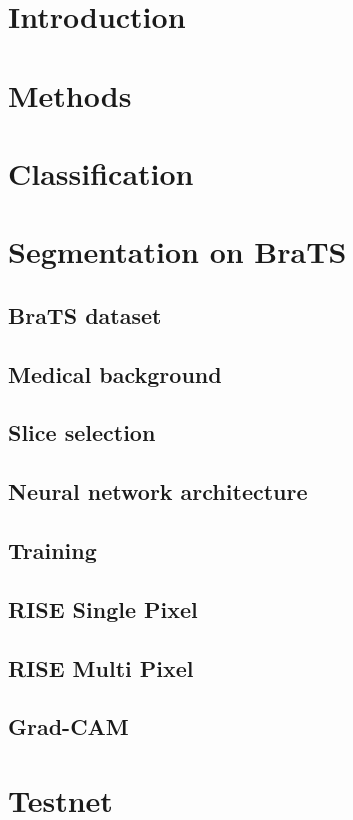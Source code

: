 \chapter{Introduction}


\chapter{Methods}


\chapter{Classification}



\chapter{Segmentation on BraTS}

\section{BraTS dataset}
\section{Medical background}
\section{Slice selection}
\section{Neural network architecture}
\section{Training}
\section{RISE Single Pixel}
\section{RISE Multi Pixel}
\section{Grad-CAM}

\chapter{Testnet}
